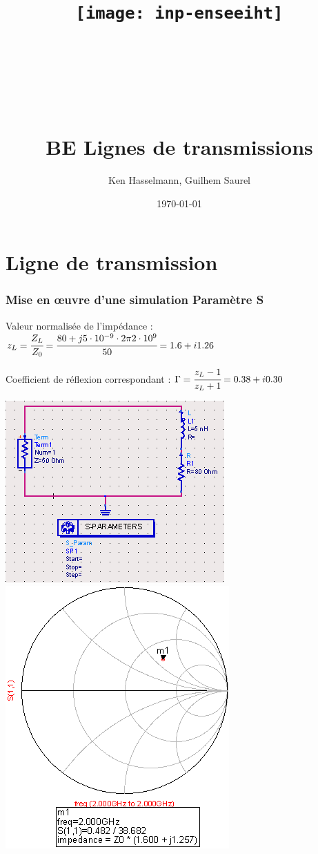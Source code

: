 \documentclass[10pt]{article}
\title{\texttt{[image: inp-enseeiht]} \\ ~ \\ ~ \\ ~ \\ ~ \\BE Lignes de transmissions}
\author{Ken Hasselmann, Guilhem Saurel}
\date{\today}
\begin{document}
 \begin{titlepage}
  \maketitle
  \tableofcontents
 \end{titlepage}

 \part{Ligne de transmission}
  \section{Mise en œuvre d’une simulation Paramètre S}
   Valeur normalisée de l’impédance : $z_L=\cfrac{Z_L}{Z_0}=\cfrac{80 + j 5 \cdot 10^{-9} \cdot 2 \pi 2 \cdot 10^9}{50} = 1.6+i1.26$

   Coefficient de réflexion correspondant : $\Gamma = \cfrac{z_L-1}{z_L+1}=0.38+i0.30$

   \includegraphics{I2_a_circuit.PNG}
   \includegraphics{I2_a_smith.PNG}
\end{document}
